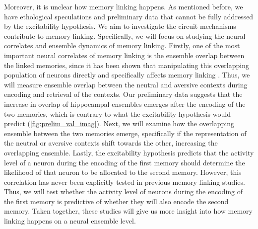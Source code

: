 \documentclass[master.tex]{subfiles}
\begin{document}
Moreover, it is unclear how memory linking happens. As mentioned before, we have
ethological speculations and preliminary data that cannot be fully addressed by
the excitability hypothesis. We aim to investigate the circuit mechanisms
contribute to memory linking. Specifically, we will focus on studying the neural
correlates and ensemble dynamics of memory linking. Firstly, one of the most
important neural correlates of memory linking is the ensemble overlap between
the linked memories, since it has been shown that manipulating this overlapping
population of neurons directly and specifically affects memory linking
\cite{yokose_overlapping_2017}. Thus, we will measure ensemble overlap between
the neutral and aversive contexts during encoding and retrieval of the contexts.
Our preliminary data suggests that the increase in overlap of hippocampal
ensembles emerges after the encoding of the two memories, which is contrary to
what the excitability hypothesis would predict (\autoref{fig:prelim_val_imag}).
Next, we will examine how the overlapping ensemble between the two memories
emerge, specifically if the representation of the neutral or aversive contexts
shift towards the other, increasing the overlapping ensemble. Lastly, the
excitability hypothesis predicts that the activity level of a neuron during the
encoding of the first memory should determine the likelihood of that neuron to
be allocated to the second memory. However, this correlation has never been
explicitly tested in previous memory linking studies. Thus, we will test whether
the activity level of neurons during the encoding of the first memory is
predictive of whether they will also encode the second memory. Taken together,
these studies will give us more insight into how memory linking happens on a
neural ensemble level.
\end{document}
